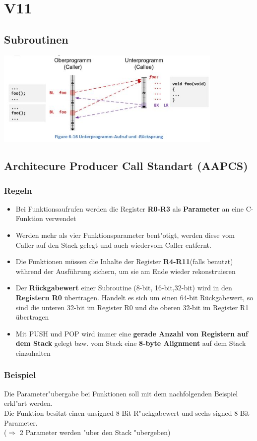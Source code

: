 \section{V11}
\subsection{Subroutinen}
\includegraphics[width=11cm]{images/subroutinen} 

\subsection{Architecure Producer Call Standart (AAPCS)}
\subsubsection{Regeln}
\begin{itemize}
    \item Bei Funktionsaufrufen werden die Register \textbf{R0-R3} als \textbf{Parameter} an eine C-Funktion verwendet
    \item Werden mehr als vier Funktionsparameter bent"otigt, werden diese vom Caller auf den Stack gelegt und auch wiedervom Caller entfernt.
    \item Die Funktionen müssen die Inhalte der Register \textbf{R4-R11}(falls benutzt) während der Ausführung sichern, um sie am Ende wieder rekonstruieren
    \item Der \textbf{Rückgabewert} einer Subroutine (8-bit, 16-bit,32-bit) wird in den \textbf{Registern R0} übertragen. Handelt es sich um einen 64-bit Rückgabewert, so sind die unteren 32-bit im Register R0 und die oberen 32-bit im Register R1 übertragen
    \item Mit PUSH und POP wird immer eine \textbf{gerade Anzahl von Registern auf dem Stack} gelegt bzw. vom Stack eine \textbf{8-byte Alignment} auf dem Stack einzuhalten
\end{itemize}

\subsubsection{Beispiel}
	Die Parameter"ubergabe bei Funktionen soll mit dem nachfolgenden Beispiel erkl"art werden. \\
	Die Funktion besitzt einen unsigned 8-Bit R"uckgabewert und sechs signed 8-Bit Parameter. \\($\Rightarrow$ 2 Parameter werden "uber den Stack "ubergeben)\\


